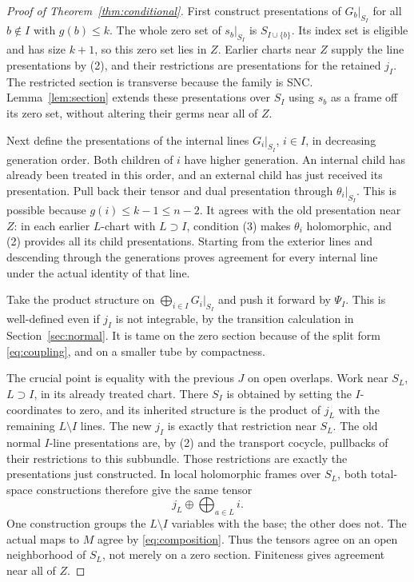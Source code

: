 \documentclass[11pt]{article}
\theoremstyle{definition}
\theoremstyle{remark}
\begin{document}
\begin{proof}[Proof of Theorem~\ref{thm:conditional}]
First construct presentations of $G_b|_{S_I}$ for all $b\notin I$ with $g(b)\leq k$. The whole zero set of $s_b|_{S_I}$ is $S_{I\cup\{b\}}$. Its index set is eligible and has size $k+1$, so this zero set lies in $Z$. Earlier charts near $Z$ supply the line presentations by (2), and their restrictions are presentations for the retained $j_I$. The restricted section is transverse because the family is SNC. Lemma~\ref{lem:section} extends these presentations over $S_I$ using $s_b$ as a frame off its zero set, without altering their germs near all of $Z$.

Next define the presentations of the internal lines $G_i|_{S_I}$, $i\in I$, in decreasing generation order. Both children of $i$ have higher generation. An internal child has already been treated in this order, and an external child has just received its presentation. Pull back their tensor and dual presentation through $\theta_i|_{S_I}$. This is possible because $g(i)\leq k-1\leq n-2$. It agrees with the old presentation near $Z$: in each earlier $L$-chart with $L\supset I$, condition (3) makes $\theta_i$ holomorphic, and (2) provides all its child presentations. Starting from the exterior lines and descending through the generations proves agreement for every internal line under the actual identity of that line.

Take the product structure on $\bigoplus_{i\in I}G_i|_{S_I}$ and push it forward by $\Psi_I$. This is well-defined even if $j_I$ is not integrable, by the transition calculation in Section~\ref{sec:normal}. It is tame on the zero section because of the split form \eqref{eq:coupling}, and on a smaller tube by compactness.

The crucial point is equality with the previous $J$ on open overlaps. Work near $S_L$, $L\supset I$, in its already treated chart. There $S_I$ is obtained by setting the $I$-coordinates to zero, and its inherited structure is the product of $j_L$ with the remaining $L\setminus I$ lines. The new $j_I$ is exactly that restriction near $S_L$. The old normal $I$-line presentations are, by (2) and the transport cocycle, pullbacks of their restrictions to this subbundle. Those restrictions are exactly the presentations just constructed. In local holomorphic frames over $S_L$, both total-space constructions therefore give the same tensor
\[
 j_L\oplus\bigoplus_{a\in L}i.
\]
One construction groups the $L\setminus I$ variables with the base; the other does not. The actual maps to $M$ agree by \eqref{eq:composition}. Thus the tensors agree on an open neighborhood of $S_L$, not merely on a zero section. Finiteness gives agreement near all of $Z$.


\end{proof}
\end{document}

